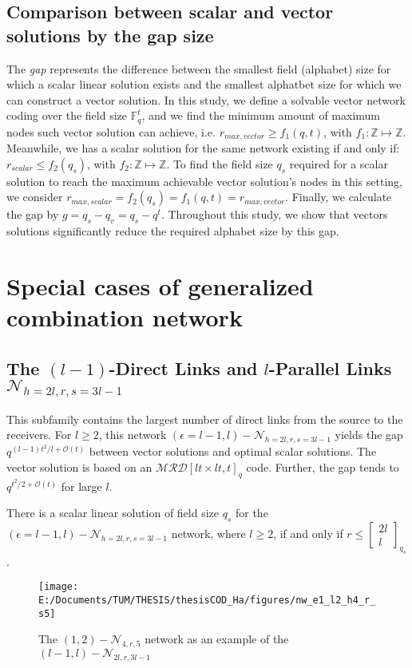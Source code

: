 \subsection{Comparison between scalar and vector solutions by the gap size}

The \textit{gap} represents the difference between the smallest field
(alphabet) size for which a scalar linear solution exists and the
smallest alphatbet size for which we can construct a vector solution.
In this study, we define a solvable vector network coding over the
field size $\ensuremath{\mathbb{F}}_{q}^{t}$, and we find the minimum
amount of maximum nodes such vector solution can achieve, i.e. $r_{max,vector}\geq f_{1}(q,t)$,
with $f_{1}:\mathbb{Z}\mapsto\mathbb{Z}$. Meanwhile, we has a scalar
solution for the same network existing if and only if: $r_{scalar}\leq f_{2}\left(q_{s}\right)$,
with $f_{2}:\mathbb{Z}\mapsto\mathbb{Z}$. To find the field size
$q_{s}$ required for a scalar solution to reach the maximum achievable
vector solution's nodes in this setting, we consider $r_{max,scalar}=f_{2}\left(q_{s}\right)=f_{1}(q,t)=r_{max,vector}$.
Finally, we calculate the gap by $g=q_{s}-q_{v}=q_{s}-q^{t}.$ Throughout
this study, we show that vectors solutions significantly reduce the
required alphabet size by this gap. 

\section{Special cases of generalized combination network}

\subsection{The $(l-1)$-Direct Links and $l$-Parallel Links $\mathcal{N}_{h=2l,r,s=3l-1}$}

This subfamily contains the largest number of direct links from the
source to the receivers. For $l\geq2$, this network $\left(\epsilon=l-1,l\right)-\mathcal{N}_{h=2l,r,s=3l-1}$
yields the gap $q^{(l-1)t^{2}/l+\mathcal{O}(t)}$ between vector solutions
and optimal scalar solutions. The vector solution is based on an $\mathcal{MRD}\left[lt\times lt,t\right]_{q}$
code. Further, the gap tends to $q^{t^{2}/2+\mathcal{O}(t)}$ for
large $l$.
\begin{lem}
There is a scalar linear solution of field size $q_{s}$ for the $\left(\epsilon=l-1,l\right)-\mathcal{N}_{h=2l,r,s=3l-1}$
network, where $l\geq2$, if and only if $r\leq\left[\begin{array}{c}
2l\\
l
\end{array}\right]_{q_{s}}$.
\end{lem}
\begin{figure}[H]
\caption{The $\left(1,2\right)-\mathcal{N}_{4,r,5}$ network as an example
of the $\left(l-1,l\right)-\mathcal{N}_{2l,r,3l-1}$ \label{fig:network_l1e2h4rs5}}

\texttt{[image: E:/Documents/TUM/THESIS/thesisCOD\_Ha/figures/nw\_e1\_l2\_h4\_r\_s5]}
\end{figure}


